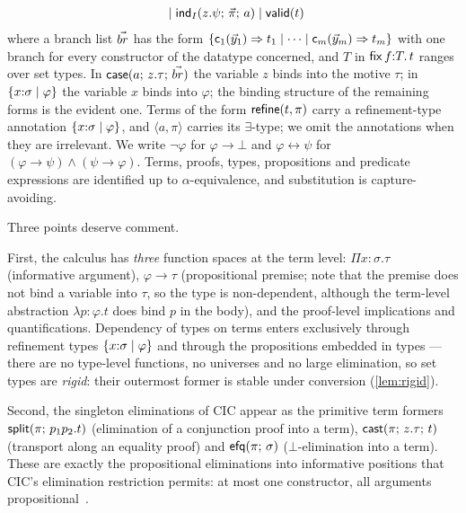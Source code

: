 \begin{definition}
\begin{align*}
  \\ &\mathrel{\phantom{\Coloneqq}}
    \mid \mathsf{ind}_{I}(z.\psi;\, \vec{\pi};\, a)
    \mid \mathsf{valid}(t)
  \end{align*}
where a branch list $\vec{br}$ has the form $\{\mathsf{c}_1(\vec{y}_1)
\Rightarrow t_1 \mid \dots \mid \mathsf{c}_m(\vec{y}_m) \Rightarrow t_m\}$
with one branch for every constructor of the datatype concerned, and $T$ in
$\mathsf{fix}\,f{:}T.\,t$ ranges over set types.  In
$\mathsf{case}(a;\,z.\tau;\,\vec{br})$ the variable $z$ binds into the motive
$\tau$; in $\{x{:}\sigma \mid \varphi\}$ the variable $x$ binds into
$\varphi$; the binding structure of the remaining forms is the evident one.
Terms of the form $\mathsf{refine}(t,\pi)$ carry a refinement-type annotation
$\{x{:}\sigma \mid \varphi\}$, and $\langle a, \pi\rangle$ carries its
$\exists$-type; we omit the annotations when they are irrelevant.  We write
$\neg\varphi$ for $\varphi \to \bot$ and
$\varphi \leftrightarrow \psi$ for
$(\varphi \to \psi) \wedge (\psi \to \varphi)$.
Terms, proofs, types, propositions and predicate expressions are identified
up to $\alpha$-equivalence, and substitution is capture-avoiding.
\end{definition}

Three points deserve comment.

First, the calculus has \emph{three} function spaces at the term level:
$\Pi x{:}\sigma.\tau$ (informative argument), $\varphi \to \tau$
(propositional premise; note that the premise does not bind a variable
into $\tau$, so the type is non-dependent, although the term-level
abstraction $\lambda p{:}\varphi.t$ does bind $p$ in the body), and the
proof-level implications and quantifications.  Dependency of types on
terms enters exclusively through refinement types
$\{x{:}\sigma \mid \varphi\}$ and through the propositions embedded in
types --- there are no type-level functions, no universes and no large
elimination, so set types are \emph{rigid}: their outermost former is
stable under conversion (\cref{lem:rigid}).

Second, the singleton eliminations of CIC appear as the primitive term
formers $\mathsf{split}(\pi;\,p_1 p_2.t)$ (elimination of a conjunction proof into
a term), $\mathsf{cast}(\pi;\,z.\tau;\,t)$ (transport along an equality proof) and
$\mathsf{efq}(\pi;\,\sigma)$ ($\bot$-elimination into a term).  These are
exactly the propositional eliminations into informative positions that
CIC's elimination restriction permits: at most one constructor, all
arguments propositional~\cite{Rocq,Letouzey2003}.


